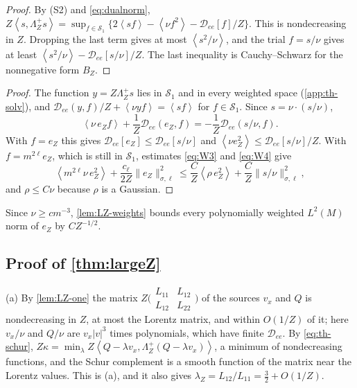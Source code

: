 \documentclass[11pt]{article}
\newcommand{\av}[1]{\left\langle #1\right\rangle}
\newcommand{\D}{\mathcal D}
\newcommand{\kap}{\kappa}
\newtheorem{lemma}[theorem]{Lemma}
\theoremstyle{definition}
\theoremstyle{remark}
\numberwithin{equation}{section}
\begin{document}
\begin{proof}
By (S2) and \eqref{eq:dualnorm},
$Z\av{s,\Lambda_Z^+s}=\sup_{f\in\mathcal S_1}\{2\av{sf}-\av{\nu f^2}
-\D_{ee}[f]/Z\}$. This is nondecreasing in $Z$. Dropping the last term
gives at most $\av{s^2/\nu}$, and the trial $f=s/\nu$ gives at least
$\av{s^2/\nu}-\D_{ee}[s/\nu]/Z$. The last inequality is Cauchy--Schwarz for
the nonnegative form $B_Z$.
\end{proof}


\begin{proof}
The function $y=Z\Lambda_Z^+s$ lies in $\mathcal S_1$ and in every weighted
space (\cref{app:th-solv}), and
$\D_{ee}(y,f)/Z+\av{\nu yf}=\av{sf}$ for $f\in\mathcal S_1$. Since
$s=\nu\cdot(s/\nu)$,
\[
 \av{\nu\,e_Zf}+\frac1Z\D_{ee}(e_Z,f)=-\frac1Z\D_{ee}(s/\nu,f).
\]
With $f=e_Z$ this gives $\D_{ee}[e_Z]\leq\D_{ee}[s/\nu]$ and
$\av{\nu e_Z^2}\leq\D_{ee}[s/\nu]/Z$. With $f=m^{2\ell}e_Z$, which is still
in $\mathcal S_1$, estimates \eqref{eq:W3} and \eqref{eq:W4} give
\[
 \av{m^{2\ell}\nu\,e_Z^2}+\frac{c_\ell}{2Z}\|e_Z\|_{\sigma,\ell}^2
 \leq\frac CZ\av{\rho\,e_Z^2}+\frac CZ\|s/\nu\|_{\sigma,\ell}^2 ,
\]
and $\rho\leq C\nu$ because $\rho$ is a Gaussian.
\end{proof}

Since $\nu\geq cm^{-3}$, \cref{lem:LZ-weights} bounds every polynomially
weighted $L^2(M)$ norm of $e_Z$ by $CZ^{-1/2}$.

\subsection{Proof of \cref{thm:largeZ}}

(a) By \cref{lem:LZ-one} the matrix
$Z\bigl(\begin{smallmatrix}L_{11}&L_{12}\\L_{12}&L_{22}\end{smallmatrix}\bigr)$
of the sources $v_x$ and $Q$ is nondecreasing in $Z$, at most the Lorentz
matrix, and within $O(1/Z)$ of it; here $v_x/\nu$ and $Q/\nu$ are
$v_x|v|^3$ times polynomials, which have finite $\D_{ee}$. By
\eqref{eq:th-schur}, $Z\kap=\min_\lambda Z\av{Q-\lambda v_x,
\Lambda_Z^+(Q-\lambda v_x)}$, a minimum of nondecreasing functions, and
the Schur complement is a smooth function of the matrix near the Lorentz
values. This is (a), and it also gives $\lambda_Z=L_{12}/L_{11}
=\tfrac32+O(1/Z)$.
\end{document}
